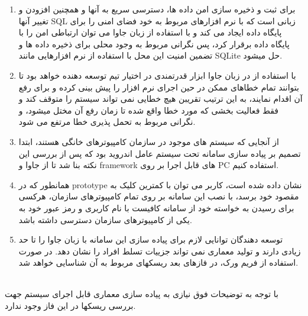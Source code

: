 \documentclass{article}
\begin{document}
\begin{enumerate}
\item برای ثبت و ذخیره سازی امن داده ها، دسترسی سریع به آنها و همچنین افزودن و تغییر آنها SQL زبانی است که با نرم افزارهای مربوط به خود فضای امنی را برای پایگاه داده ایجاد می کند و با استفاده از زبان جاوا می توان ارتباطی امن را با پایگاه داده برقرار کرد، پس نگرانی مربوط به وجود محلی برای ذخیره داده ها و تضمین امنیت این محل با استفاده از نرم افزارهایی مانند SQLite حل میشود.

\item با استفاده از
در زبان جاوا ابزار قدرتمندی در اختیار تیم توسعه دهنده خواهد بود تا بتوانند تمام خطاهای ممکن در حین اجرای نرم افزار را پیش بینی کرده و برای رفع آن اقدام نمایند، به این ترتیب تقریبن هیچ خطایی نمی تواند سیستم را متوقف کند و فقط فعالیت بخشی که مورد خطا واقع شده تا زمان رفع آن مختل میشود، و نگرانی مربوط به تحمل پذیری خطا مرتفع می شود.

\item از آنجایی که سیستم های موجود در سازمان کامپیوترهای خانگی هستند، ابتدا تصمیم بر پیاده سازی سامانه تحت سیستم عامل اندروید بود که پس از بررسی این نکته بنا شد تا از جاوا و framework های قابل اجرا بر روی PC استفاده کنیم.

\item همانطور که در prototype نشان داده شده است، کاربر می توان با کمترین کلیک به مقصود خود برسد، با نصب این سامانه بر روی تمام کامپیوترهای سازمان، هرکسی برای رسیدن به خواسته خود از سامانه کافیست با نام کاربری و رمز عبور خود به یکی از کامپیوترهای سازمان دسترسی داشته باشد.

\item توسعه دهندگان توانایی لازم برای پیاده سازی این سامانه با زبان جاوا را تا حد زیادی دارند و تولید معماری نمی تواند جزییات تسلط افراد را نشان دهد. در صورت استفاده از فریم ورک، در فازهای بعد ریسکهای مربوط به آن شناسایی خواهد شد.
\end{enumerate}
\\

با توجه به توضیحات فوق نیازی به پیاده سازی معماری قابل اجرای سیستم جهت بررسی ریسکها در این فاز وجود ندارد.















\end{document}
